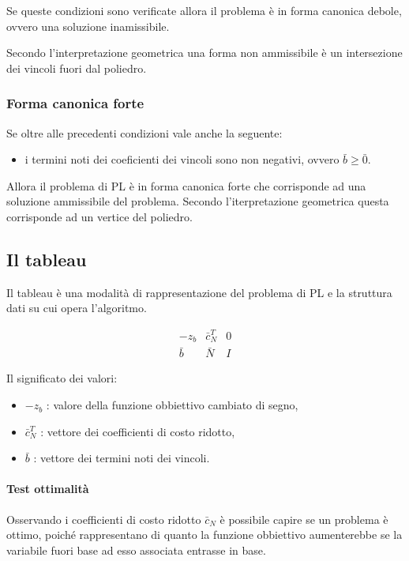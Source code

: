 Se queste condizioni sono verificate allora il problema è in forma canonica debole, ovvero una soluzione inamissibile.

Secondo l'interpretazione geometrica una forma non ammissibile è un intersezione dei vincoli fuori dal poliedro.


\subsubsection{Forma canonica forte}
Se oltre alle precedenti condizioni vale anche la seguente:
\begin{itemize}
	\item i termini noti dei coeficienti dei vincoli sono non negativi, ovvero $\bar{b}\geq\bar{0}$.
\end{itemize}

Allora il problema di PL è in forma canonica forte che corrisponde ad una soluzione ammissibile del problema. Secondo l'iterpretazione geometrica questa corrisponde ad un vertice del poliedro.


\subsection{Il tableau}
Il tableau è una modalità di rappresentazione del problema di PL e la struttura dati su cui opera l'algoritmo.

\begin{equation}\label{tableau}
	\begin{array}{c|cc}
		-z_b&\bar{c}_N^T&0\\
		\hline
		\bar{b}&\bar{N}&I	 
	\end{array}
\end{equation}

Il significato dei valori:
\begin{itemize}
	\item $-z_b$ : valore della funzione obbiettivo cambiato di segno,
	\item $\bar{c}_N^T$ : vettore dei coefficienti  di costo ridotto,
	\item $\bar{b}$ : vettore dei termini noti dei vincoli.
\end {itemize}


\paragraph{Test ottimalità}
Osservando i coefficienti di costo ridotto $\bar{c}_N$ è possibile capire se un problema è ottimo, poiché rappresentano di quanto la funzione obbiettivo aumenterebbe se la variabile fuori base ad esso associata entrasse in base.

